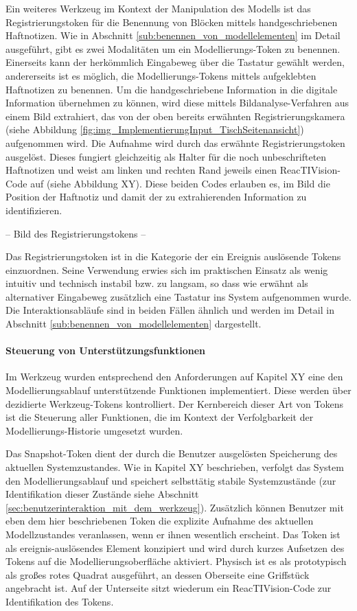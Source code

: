 Ein weiteres Werkzeug im Kontext der Manipulation des Modells ist das Registrierungstoken für die Benennung von Blöcken mittels handgeschriebenen Haftnotizen. Wie in Abschnitt \ref{sub:benennen_von_modellelementen} im Detail ausgeführt, gibt es zwei Modalitäten um ein Modellierungs-Token zu benennen. Einerseits kann der herkömmlich Eingabeweg über die Tastatur gewählt werden, andererseits ist es möglich, die Modellierungs-Tokens mittels aufgeklebten Haftnotizen zu benennen. Um die handgeschriebene Information in die digitale Information übernehmen zu können, wird diese mittels Bildanalyse-Verfahren aus einem Bild extrahiert, das von der oben bereits erwähnten Registrierungskamera (siehe Abbildung \ref{fig:img_ImplementierungInput_TischSeitenansicht}) aufgenommen wird. Die Aufnahme wird durch das erwähnte Registrierungstoken ausgelöst. Dieses fungiert gleichzeitig als Halter für die noch unbeschrifteten Haftnotizen und weist am linken und rechten Rand jeweils einen ReacTIVision-Code auf (siehe Abbildung XY). Diese beiden Codes erlauben es, im Bild die Position der Haftnotiz und damit der zu extrahierenden Information zu identifizieren. 

-- Bild des Registrierungstokens --

Das Registrierungstoken ist in die Kategorie der ein Ereignis auslösende Tokens einzuordnen. Seine Verwendung erwies sich im praktischen Einsatz als wenig intuitiv und technisch instabil bzw. zu langsam, so dass wie erwähnt als alternativer Eingabeweg zusätzlich eine Tastatur ins System aufgenommen wurde. Die Interaktionsabläufe sind in beiden Fällen ähnlich und werden im Detail in Abschnitt \ref{sub:benennen_von_modellelementen} dargestellt.

\paragraph{Steuerung von Unterstützungsfunktionen} %
\label{par:steuerung_von_unterstützungsfunktionen}

Im Werkzeug wurden entsprechend den Anforderungen auf Kapitel XY eine den Modellierungsablauf unterstützende Funktionen implementiert. Diese werden über dezidierte Werkzeug-Tokens kontrolliert. Der Kernbereich dieser Art von Tokens ist die Steuerung aller Funktionen, die im Kontext der Verfolgbarkeit der Modellierungs-Historie umgesetzt wurden. 

Das Snapshot-Token dient der durch die Benutzer ausgelösten Speicherung des aktuellen Systemzustandes. Wie in Kapitel XY beschrieben, verfolgt das System den Modellierungsablauf und speichert selbsttätig stabile Systemzustände (zur Identifikation dieser Zustände siehe Abschnitt \ref{sec:benutzerinteraktion_mit_dem_werkzeug}). Zusätzlich können Benutzer mit eben dem hier beschriebenen Token die explizite Aufnahme des aktuellen Modellzustandes veranlassen, wenn er ihnen wesentlich erscheint. Das Token ist als ereignis-auslösendes Element konzipiert und wird durch kurzes Aufsetzen des Tokens auf die Modellierungsoberfläche aktiviert. Physisch ist es als prototypisch als großes rotes Quadrat ausgeführt, an dessen Oberseite eine Griffstück angebracht ist. Auf der Unterseite sitzt wiederum ein ReacTIVision-Code zur Identifikation des Tokens.

